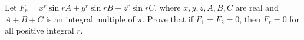 Let $F_r=x^r\sin{rA}+y^r\sin{rB}+z^r\sin{rC}$,  where $x,y,z,A,B,C$ are real and $A+B+C$ is an integral multiple of $\pi$. Prove that if $F_1=F_2=0$,  then $F_r=0$ for all positive integral $r$.
